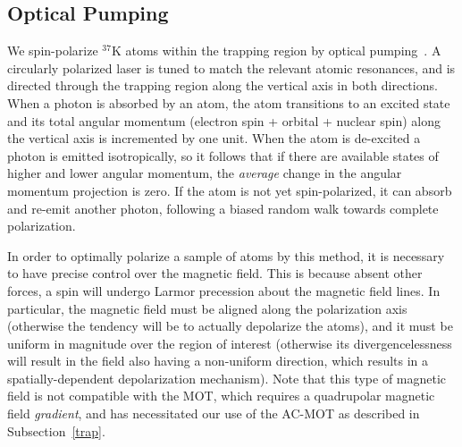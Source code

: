 

%
\subsection{Optical Pumping}
\label{op}
We spin-polarize $^{37}\textrm{K}$ atoms within the trapping region by optical pumping~\cite{ben_OP}.  A circularly polarized laser is tuned to match the relevant atomic resonances, and is directed through the trapping region along the vertical axis in both directions.  When a photon is absorbed by an atom, the atom transitions to an excited state and its total angular momentum (electron spin + orbital + nuclear spin) along the vertical axis is incremented by one unit.  When the atom is de-excited a photon is emitted isotropically, 
so it follows that if there are available states of higher and lower angular momentum, the \emph{average} change in the angular momentum projection is zero.  If the atom is not yet spin-polarized, it can absorb and re-emit another photon, following a biased random walk towards complete polarization.  

In order to optimally polarize a sample of atoms by this method, it is necessary to have precise control over the magnetic field.  This is because absent other forces, a spin will undergo Larmor precession about the magnetic field lines.  In particular, the magnetic field must be aligned along the polarization axis (otherwise the tendency will be to actually depolarize the atoms), and it must be uniform in magnitude over the region of interest (otherwise its divergencelessness will result in the field also having a non-uniform direction, which results in a spatially-dependent depolarization mechanism).  Note that this type of magnetic field is not compatible with the MOT, which requires a quadrupolar magnetic field \emph{gradient}, and has necessitated our use of the AC-MOT as described in Subsection~\ref{trap}.

